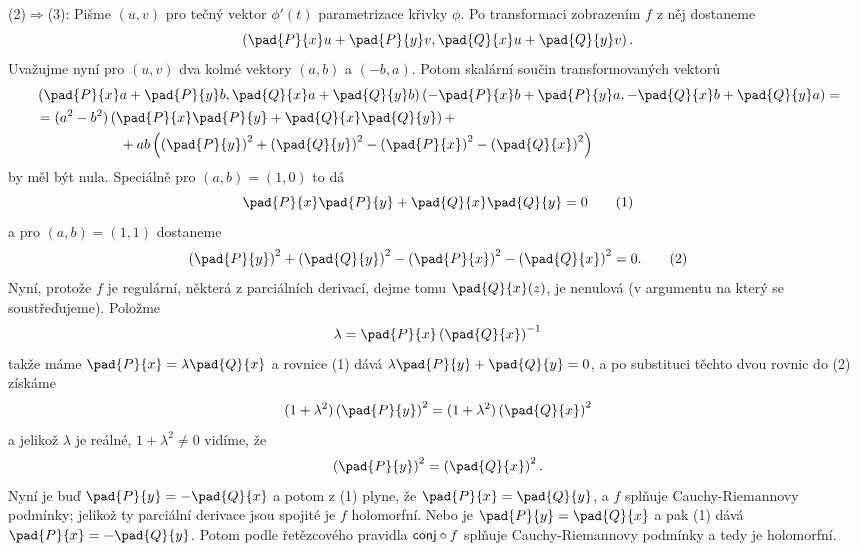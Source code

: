 \documentclass[12pt]{article}
\begin{document}
(2)$\Rightarrow$(3): Pišme $(u,v)$ pro tečný vektor $\phi'(t)$ parametrizace křivky $\phi$. Po transformaci zobrazením  $f$ z něj dostaneme
$$
\left(\pad{P}{x}u+\pad{P}{y}v,\pad{Q}{x}u+\pad{Q}{y}v\right).
$$
Uvažujme nyní pro $(u,v)$ dva kolmé vektory $(a,b)$ a $(-b,a)$. Potom skalární součin transformovaných vektorů
$$
\begin{aligned}
&\left(\pad{P}{x}a+\pad{P}{y}b,\pad{Q}{x}a+\pad{Q}{y}b\right)
\left(-\pad{P}{x}b+\pad{P}{y}a,-\pad{Q}{x}b+\pad{Q}{y}a\right)=\\
&=(a^2-b^2)\left(\pad{P}{x}\pad{P}{y}+\pad{Q}{x}\pad{Q}{y}\right)+\\
&\quad\quad\quad\quad\quad\quad+ab\left(\left(\pad{P}{y}\right)^2+\left(\pad{Q}{y}\right)^2-\left(\pad{P}{x}\right)^2-\left(\pad{Q}{x}\right)^2\right)
\end{aligned}
$$
by měl být nula. Speciálně pro $(a,b)=(1,0)$ to dá
\begin{equation}
\pad{P}{x}\pad{P}{y}+\pad{Q}{x}\pad{Q}{y}=0
\tag{1}
\end{equation}
a pro $(a,b)=(1,1)$ dostaneme
\begin{equation}
\left(\pad{P}{y}\right)^2+\left(\pad{Q}{y}\right)^2-\left(\pad{P}{x}\right)^2-\left(\pad{Q}{x}\right)^2=0.\tag{2}
\end{equation}
Nyní, protože $f$ je regulární, některá z parciálních derivací, dejme tomu $\pad{Q}{x}(z)$, je nenulová (v argumentu na který se soustřeďujeme). Položme
$$
\lambda=\pad{P}{x}\left(\pad{Q}{x}\right)^{-1}
$$ 
takže máme $\pad{P}{x}=\lambda\pad{Q}{x}$ a rovnice (1) dává
$
\lambda\pad{P}{y}+\pad{Q}{y}=0
$, 
a po substituci těchto dvou rovnic do (2) získáme
$$
(1+\lambda^2)\left(\pad{P}{y}\right)^2=(1+\lambda^2)\left(\pad{Q}{x}\right)^2
$$
a jelikož $\lambda$ je reálné, $1+\lambda^2\neq0$ vidíme, že
$$
\left(\pad{P}{y}\right)^2=\left(\pad{Q}{x}\right)^2.
$$
Nyní je buď $\pad{P}{y}=-\pad{Q}{x}$ a potom z (1) plyne, že
 $\pad{P}{x}=\pad{Q}{y}$, a $f$ splňuje Cauchy-Riemannovy podmínky;
jelikož ty parciální derivace jsou spojité je
$f$ holomorfní. Nebo je $\pad{P}{y}=\pad{Q}{x}$ a pak (1) dává
$\pad{P}{x}=-\pad{Q}{y}$. Potom  podle řetězcového pravidla ${\sf conj}\circ f$ splňuje Cauchy-Riemannovy podmínky a tedy je holomorfní. \sq
\end{document}
